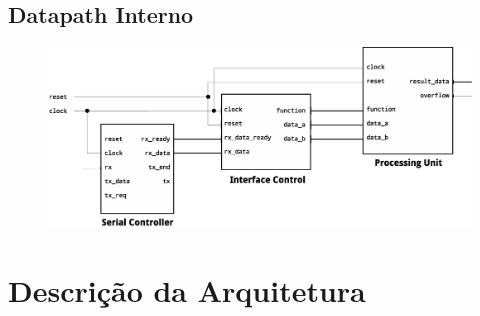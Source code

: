\documentclass{report}
\begin{document}
  \section{Datapath Interno}
    \begin{figure}[H]
      \centering
      \includegraphics[width=\linewidth]{datapath/ip_datapath.eps}
    \end{figure}

\chapter{Descrição da Arquitetura}

	
	
	

	

% 
% 
\end{document}
